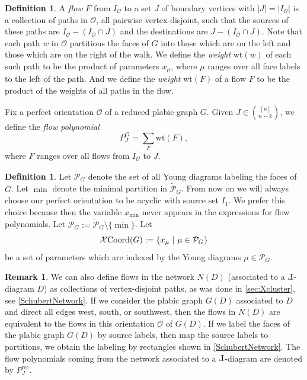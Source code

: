 \documentclass{amsart}
\def\Le{\hbox{\rotatebox[origin=c]{180}{$\Gamma$}}}
\theoremstyle{definition}
\newtheorem{definition}[thm]{Definition}
\newtheorem{remark}[thm]{Remark}
\numberwithin{equation}{section}
\newcommand{\rect}{\mathrm{rec}}
\newcommand{\wt}{\mathrm{wt}}
\def\O{\mathcal{O}}
\newcommand{\minimal}{\operatorname{min}}
\newcommand{\TB}{{\mathcal X\hskip -.05cm\operatorname{Coord}}}
\begin{document}
\begin{definition}\label{def:flow}
A \emph{flow} $F$ from $I_{\O}$ to a set $J$ of boundary vertices
with 
$|J|=|I_{\O}|$ 
is a collection of paths
in $\O$, all pairwise vertex-disjoint, 
such that the sources of these paths are $I_{\O} - (I_{\O} \cap J)$
and the destinations are $J - (I_{\O} \cap J)$.
Note that each path %
$w$ in $\O$ partitions the faces of $G$ into those 
which are on the left and those which are on the right of the 
walk. %
We define the \emph{weight} $\wt(w)$ of 
each such path %
to be the product of 
parameters $x_{\mu}$, where $\mu$ ranges over all face labels 
to the left of the path.  And we define the 
\emph{weight} $\wt(F)$ of a flow $F$ to be the product of the weights of 
all paths in the flow.

Fix a perfect orientation $\O$ of a reduced plabic graph $G$.
Given $J \in {[n] \choose n-k}$, 
we define the {\it flow polynomial}
\begin{equation}\label{eq:Plucker2}
P_J^G = \sum_F \wt(F),
\end{equation}
where $F$ ranges over all flows from $I_{\O}$ to $J$.
\end{definition}


\begin{definition}\label{def:PG}
Let $\tilde{\mathcal{P}}_G$
denote the set of all Young diagrams labeling the faces of $G$.
Let $\minimal$ denote the minimal partition in $\tilde{\mathcal{P}}_G$.
From now on we will always
choose our perfect orientation to be acyclic  with source set $I_{1}$.
We prefer this choice because
then the variable
$x_{\minimal}$ never appears in the expressions for flow polynomials.
Let ${\mathcal P}_G:=
\tilde{\mathcal P}_G\setminus \{\minimal\}$.
Let \begin{equation}\label{e:TB}
{\TB}(G) := \{x_{\mu}\ |\ \mu\in 
	{\mathcal P}_G \}
\end{equation}
be a set of  
parameters which are indexed by the Young diagrams $\mu\in {\mathcal P}_G$.
\end{definition}

\begin{remark}\label{rem:flows}
We can also define flows in the network $N(D)$
(associated to a $\Le$-diagram $D$) as collections
of vertex-disjoint paths, as was done in \cref{sec:Xcluster},
see \cref{SchubertNetwork}.
If we consider the plabic graph $G(D)$
associated to $D$ and direct all edges west, south, or southwest,
then the  flows in $N(D)$ are equivalent
to the flows in this orientation $\O$ of $G(D)$.
If we label the faces of the plabic graph $G(D)$
by source labels, then map the source labels to partitions,
we obtain the labeling by rectangles shown in \cref{SchubertNetwork}.
The flow polynomials coming from the network 
associated to a $\Le$-diagram are denoted by $P_J^{\rect}$.
\end{remark}
\end{document}

